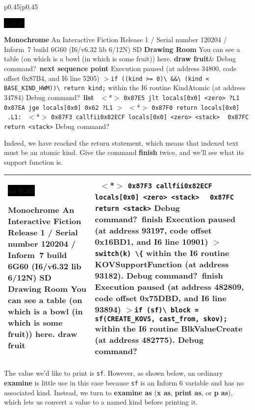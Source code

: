\documentclass{book}
\newcommand{\n}{\hspace*{\fill}\newline}
\newcommand{\terp}[2]{\begin{center}\begin{tabular}{p{0.45\textwidth}|p{0.45\textwidth}}\midrule #1&#2\\\midrule\end{tabular}\end{center}}
\newcommand{\glkheading}[1]{\textbf{#1}}
\newcommand{\glkinput}[1]{\textbf{#1}}
\newcommand{\glkstatusline}[2]{\centerline{\colorbox{black}{\hbox to 0.45\textwidth{\textcolor{white}{#1\hfil #2}}}}}
\newcommand{\storyprompt}{\raisebox{1.5pt}{\(>\)}}
\newcommand{\cursor}{\raisebox{-1.5pt}{\RectangleThin}}
\newcommand{\markedindent}{\(>\)\qquad}
\newcommand{\markeddip}{\(>\)\ }
\newcommand{\unmarkeddip}{\hphantom{\(>\)}\ }
\newcommand{\unmarkeddipb}{\ \hphantom{\(>\)}}
\begin{document}
\terp{\glkstatusline{Drawing Room}{0/1}\n
  \glkheading{Monochrome}\n
  An Interactive Fiction\n
  Release 1 / Serial number 120204 / Inform~7 build 6G60 (I6/v6.32 lib 6/12N) SD\n
  \n
  \glkheading{Drawing Room}\n
  You can see a table (on which is a bowl (in which is some fruit)) here.\n
  \n
  \storyprompt\glkinput{draw fruit}}{%
  \n
  Debug command?\ \glkinput{next sequence point}\n
  \n
  Execution paused (at address 34800, code offset 0x87B4, and I6 line 5205)\n
  \markedindent \lstinline{if ((kind >= 0)}\lstinline{\ &&}\lstinline{\ (kind < BASE_KIND_HWM))}\lstinline{\ return kind;}\n
  within the I6 routine KindAtomic (at address 34784)\n
  \n
  Debug command?\ \glkinput{list}\n
  \n
  \unmarkeddip \(<\)*\(>\) \lstinline{0x87E5 jlt locals[0x0] <zero> ?L1}\n
  \unmarkeddip \hphantom{\(<\)*\(>\)} \lstinline{0x87EA jge locals[0x0] 0x62 ?L1}\n
  \markeddip \(<\)*\(>\) \lstinline{0x87F0 return locals[0x0]}\n
  \unmarkeddip \lstinline{.L1:}\n
  \unmarkeddip \(<\)*\(>\) \lstinline @0x87F3 callfii@\hfill\lstinline @0x82ECF locals[0x0] <zero> <stack>@\n
  \unmarkeddip \hphantom{\(<\)*\(>\)} \lstinline{0x87FC return <stack>}\n
  \n
  Debug command?\ \cursor}

Indeed, we have reached the return statement, which means that indexed text must
be an atomic kind.  Give the command \glkinput{finish} twice, and we'll see what
its support function is.

\terp{\glkstatusline{Drawing Room}{0/1}\n
  \glkheading{Monochrome}\n
  An Interactive Fiction\n
  Release 1 / Serial number 120204 / Inform~7 build 6G60 (I6/v6.32 lib 6/12N) SD\n
  \n
  \glkheading{Drawing Room}\n
  You can see a table (on which is a bowl (in which is some fruit)) here.\n
  \n
  \storyprompt\glkinput{draw fruit}}{%
  \unmarkeddipb \(<\)*\(>\) \lstinline @0x87F3 callfii@\hfill\lstinline @0x82ECF locals[0x0] <zero> <stack>@\n
  \unmarkeddip \hphantom{\(<\)*\(>\)} \lstinline{0x87FC return <stack>}\n
  \n
  Debug command?\ \glkinput{finish}\n
  \n
  Execution paused (at address 93197, code offset 0x16BD1, and I6 line 10901)\n
  \markedindent \lstinline @switch(k) \{@\n
  within the I6 routine KOVSupportFunction (at address 93182).\n
  \n
  Debug command?\ \glkinput{finish}\n
  \n
  Execution paused (at address 482809, code offset 0x75DBD, and I6 line 93894)\n
  \markedindent \lstinline{if (sf)}\lstinline{\ block = sf(CREATE_KOVS, cast_from, skov);}\n
  within the I6 routine BlkValueCreate (at address 482775).\n
  \n
  Debug command?\ \cursor}

The value we'd like to print is \lstinline{sf}.  However, as shown below, an
ordinary \glkinput{examine} is little use in this case because \lstinline{sf} is
an Inform 6 variable and has no associated kind.  Instead, we turn to
\glkinput{examine as} (\glkinput{x as}, \glkinput{print as}, or \glkinput{p
  as}), which lets us convert a value to a named kind before printing it.
\end{document}
